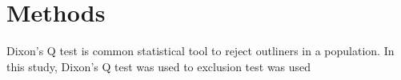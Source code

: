 \chapter{Methods}

Dixon's Q test is common statistical tool to reject outliners in a population. In this study,  Dixon's Q test was used to   exclusion test was used 